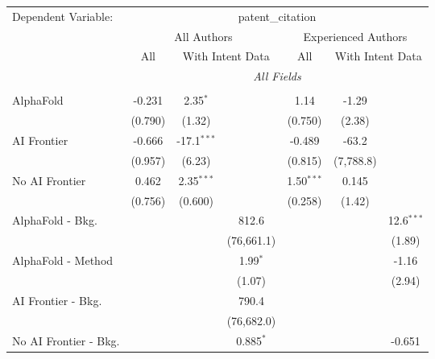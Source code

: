 \begingroup
\centering
\begin{tabular}{lcccccc}
   \tabularnewline \midrule \midrule
   Dependent Variable: & \multicolumn{6}{c}{patent\_citation}\\
 & \multicolumn{3}{c}{All Authors} & \multicolumn{3}{c}{Experienced Authors} \\
\cmidrule(lr){2-4} \cmidrule(lr){5-7}
 & \multicolumn{1}{c}{All} & \multicolumn{2}{c}{With Intent Data} & \multicolumn{1}{c}{All} & \multicolumn{2}{c}{With Intent Data} \\
\cmidrule(lr){2-2} \cmidrule(lr){3-4} \cmidrule(lr){5-5} \cmidrule(lr){6-7}
 & \multicolumn{6}{c}{\textit{All Fields}} \\ \\
   AlphaFold               & -0.231  & 2.35$^{*}$    &              & 1.14         & -1.29     &   \\   
                           & (0.790) & (1.32)        &              & (0.750)      & (2.38)    &   \\   
   AI Frontier             & -0.666  & -17.1$^{***}$ &              & -0.489       & -63.2     &   \\   
                           & (0.957) & (6.23)        &              & (0.815)      & (7,788.8) &   \\   
   No AI Frontier          & 0.462   & 2.35$^{***}$  &              & 1.50$^{***}$ & 0.145     &   \\   
                           & (0.756) & (0.600)       &              & (0.258)      & (1.42)    &   \\   
   AlphaFold - Bkg.        &         &               & 812.6        &              &           & 12.6$^{***}$\\   
                           &         &               & (76,661.1)   &              &           & (1.89)\\   
   AlphaFold - Method      &         &               & 1.99$^{*}$   &              &           & -1.16\\   
                           &         &               & (1.07)       &              &           & (2.94)\\   
   AI Frontier - Bkg.      &         &               & 790.4        &              &           &   \\   
                           &         &               & (76,682.0)   &              &           &   \\   
   No AI Frontier - Bkg.   &         &               & 0.885$^{*}$  &              &           & -0.651\\   

\end{tabular}

